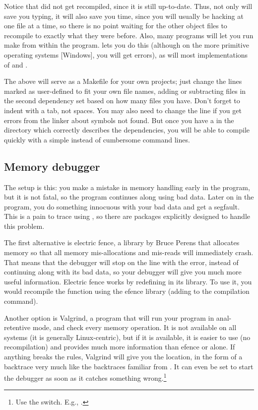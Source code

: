 \documentclass[12pt]{article}
\makeatletter
\def\ind#1{\index{#1}#1}
\def\ttind#1{\index{#1@\cinline{#1}}\cinline{#1}}
\makeatother
\begin{document}
Notice that  did not get recompiled, since it is still
up-to-date. Thus, not only will  save you typing, it will also
save you time, since you will usually be hacking at one file at a time,
so there is no point waiting for the other object files to recompile
to exactly what they were before. Also, many programs will let you run
make from within the program.  lets you do this (although on
the more primitive operating systems [Windows], you will get errors),
as will most implementations of  and .

The above will serve as a Makefile for your own projects; just change
the lines marked as user-defined to fit your own file names, adding or
subtracting files in the second dependency set based on how many  files you have. Don't forget to indent with a tab, not spaces. You
may also need to change the  line if you get errors from
the linker about symbols not found. But once you have a 
in the directory which correctly describes the dependencies, you will
be able to compile quickly with a simple  instead of 
cumbersome command lines.

\subsection{Memory debugger}  

The setup is this: you make a mistake in memory handling early in the
program, but it is not fatal, so the program continues along using bad
data. Later on in the program, you do something innocuous with your bad
data and get a segfault. This is a pain to trace using , so
there are packages explicitly designed to handle this problem.

The first alternative is \ind{electric fence}, a
library by Bruce Perens that allocates memory so that all memory
mis-allocations and mis-reads will immediately crash.  That means that
the debugger will stop on the line with the error, instead of continuing
along with its bad data, so your debugger will give you much more useful
information.  Electric fence works by redefining \ttind{malloc} in 
its library. To use it, you would recompile the function
using the efence library (adding  to the compilation
command).


Another option is \ind{Valgrind}, a program that will
run your program in anal-retentive mode, and check every memory operation. 
It is not available on all systems (it is generally Linux-centric), but
if it is available, it is easier to use (no recompilation) and provides much more information than efence or
 alone. If anything breaks the rules, Valgrind will give you
the location, in the form of a backtrace very much like the backtraces
familiar from . It can even be set to start the debugger as soon
as it catches something wrong.\footnote{Use the  switch.
E.g., .}
\end{document}
